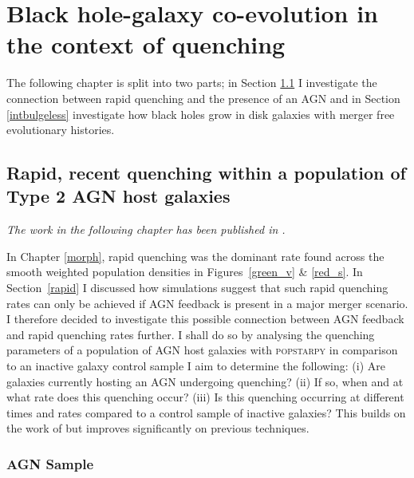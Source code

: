 
\chapter{Black hole-galaxy co-evolution in the context of quenching}\label{agnfeedback}

The following chapter is split into two parts; in Section \ref{agnfeedback} I investigate the connection between rapid quenching and the presence of an AGN and in Section \ref{intbulgeless} investigate how black holes grow in disk galaxies with merger free evolutionary histories. 

\section{Rapid, recent quenching within a population of Type 2 AGN host galaxies}\label{agnfeedback}

\emph{The work in the following chapter has been published in \citet{smethurst16}.}

In Chapter \ref{morph}, rapid quenching was the dominant rate found across the smooth weighted population densities in Figures~\ref{green_v} \& \ref{red_s}. In Section~\ref{rapid} I discussed how simulations suggest that such rapid quenching rates can only be achieved if AGN feedback is present in a major merger scenario. I therefore decided to investigate this possible connection between AGN feedback and rapid quenching rates further. I shall do so by analysing the quenching parameters of a population of AGN host galaxies with \textsc{popstarpy} in comparison to an inactive galaxy control sample I  aim to determine the following: (i) Are galaxies currently hosting an AGN undergoing quenching? (ii) If so, when and at what rate does this quenching occur? (iii) Is this quenching occurring at different times and rates compared to a control sample of inactive galaxies? This builds on the work of \citet{Martin07} but improves significantly on previous techniques.

\subsection{AGN Sample}\label{agnsample}


